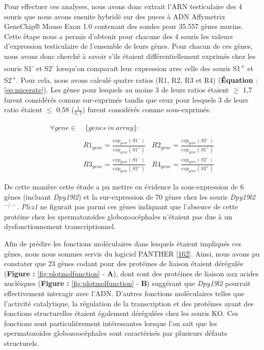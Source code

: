 \documentclass[12pt,a4paper,twoside]{ugathesis}
\theoremstyle{definition}
\theoremstyle{definition}
\theoremstyle{definition}
\theoremstyle{remark}
\begin{document}
Pour effectuer ces analyses, nous avons donc extrait l'ARN testiculaire
des 4 souris que nous avons ensuite hybridé sur des puces à ADN
Affymetrix GeneChip® Mouse Exon 1.0 contenant des sondes pour 35.557
gènes murins. Cette étape nous a permis d'obtenir pour chacune des 4
souris les valeurs d'expression testiculaire de l'ensemble de leurs
gènes. Pour chacun de ces gènes, nous avons donc cherché à savoir s'ils
étaient différentiellement exprimés chez les souris
S1\textsuperscript{-} et S2\textsuperscript{-} lorsqu'on comparait leur
expression avec celle des souris S1\textsuperscript{+} et
S2\textsuperscript{+}. Pour cela, nous avons calculé quatre ratios (R1,
R2, R3 et R4) (\textbf{Équation} : \eqref{eq:micerate}). Les gènes pour
lesquels au moins 3 de leurs ratios étaient \(\ge\) 1,7 furent
considérés comme sur-exprimés tandis que ceux pour lesquels 3 de leurs
ratio étaient \(\le\) 0,58 (\(\frac{1}{1,7}\)) furent considérés comme
sous-exprimés.

\begin{equation} 
\begin{split}
\forall gene \in & \ \{genes\ in\ array\}: \\
\\
& R1_{gene} = \frac{exp_{gene}(S1^-)}{exp_{gene}(S1^+)} \ \ \ \ R2_{gene} = \frac{exp_{gene}(S2^-)}{exp_{gene}(S1^+)} \\
& R3_{gene} = \frac{exp_{gene}(S1^-)}{exp_{gene}(S2^+)} \ \ \ \ R4_{gene} = \frac{exp_{gene}(S2^-)}{exp_{gene}(S2^+)} 
\label{eq:micerate}
\end{split}
\end{equation}

De cette manière cette étude a pu mettre en évidence la sous-expression
de 6 gènes (incluant \emph{Dpy19l2}) et la sur-expression de 70 gènes
chez les souris \emph{Dpy19l2}\(^{-/-}\). \emph{Plcz1} ne figurait pas
parmi ces gènes indiquant que l'absence de cette protéine chez les
spermatozoïdes globozoocéphales n'étaient pas due à un dysfonctionnement
transcriptionnel.

Afin de prédire les fonctions moléculaires dans lesquels étaient
impliqués ces gènes, nous nous sommes servis du logiciel PANTHER
{[}\protect\hyperlink{ref-Mi2017}{162}{]}. Ainsi, nous avons pu
constater que 23 gènes codant pour des protéines de liaison étaient
dérégulés (\textbf{Figure : }\ref{fig:plotmolfunction} - \textbf{A}),
dont sont des protéines de liaison aux acides nucléiques (\textbf{Figure
: }\ref{fig:plotmolfunction} - \textbf{B}) suggérant que \emph{Dpy19l2}
pourrait effectivement interagir avec l'ADN. D'autres fonctions
moléculaires telles que l'activité catalytique, la régulation de la
transcription et des protéines ayant des fonctions structurelles étaient
également dérégulées chez les souris KO. Ces fonctions sont
particulièrement intéressantes lorsque l'on sait que les spermatozoïdes
globozoocéphales sont caractérisés par plusieurs défauts structurels.
\end{document}
